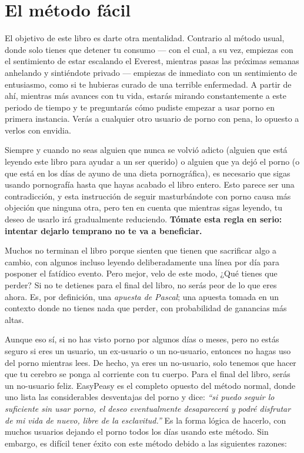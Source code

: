 \documentclass[
  spanish,
  openany]{book}
\begin{document}
\hypertarget{el-metodo-facil}{%
\chapter{El método fácil}\label{el-metodo-facil}}

El objetivo de este libro es darte otra mentalidad. Contrario al método usual, donde solo tienes que detener tu consumo --- con el cual, a su vez, empiezas con el sentimiento de estar escalando el Everest, mientras pasas las próximas semanas anhelando y sintiéndote privado --- empiezas de inmediato con un sentimiento de entusiasmo, como si te hubieras curado de una terrible enfermedad. A partir de ahí, mientras más avances con tu vida, estarás mirando constantemente a este periodo de tiempo y te preguntarás cómo pudiste empezar a usar porno en primera instancia. Verás a cualquier otro usuario de porno con pena, lo opuesto a verlos con envidia.

Siempre y cuando no seas alguien que nunca se volvió adicto (alguien que está leyendo este libro para ayudar a un ser querido) o alguien que ya dejó el porno (o que está en los días de ayuno de una dieta pornográfica), es necesario que sigas usando pornografía hasta que hayas acabado el libro entero. Esto parece ser una contradicción, y esta instrucción de seguir masturbándote con porno causa más objeción que ninguna otra, pero ten en cuenta que mientras sigas leyendo, tu deseo de usarlo irá gradualmente reduciendo. \textbf{Tómate esta regla en serio: intentar dejarlo temprano no te va a beneficiar.}

Muchos no terminan el libro porque sienten que tienen que sacrificar algo a cambio, con algunos incluso leyendo deliberadamente una línea por día para posponer el fatídico evento. Pero mejor, velo de este modo, ¿Qué tienes que perder? Si no te detienes para el final del libro, no serás peor de lo que eres ahora. Es, por definición, una \emph{apuesta de Pascal}; una apuesta tomada en un contexto donde no tienes nada que perder, con probabilidad de ganancias más altas.

Aunque eso sí, si no has visto porno por algunos días o meses, pero no estás seguro si eres un usuario, un ex-usuario o un no-usuario, entonces no hagas uso del porno mientras lees. De hecho, ya eres un no-usuario, solo tenemos que hacer que tu cerebro se ponga al corriente con tu cuerpo. Para el final del libro, serás un no-usuario feliz. EasyPeasy es el completo opuesto del método normal, donde uno lista las considerables desventajas del porno y dice:
\emph{``si puedo seguir lo suficiente sin usar porno, el deseo eventualmente desaparecerá y podré disfrutar de mi vida de nuevo, libre de la esclavitud.''}
Es la forma lógica de hacerlo, con muchos usuarios dejando el porno todos los días usando este método. Sin embargo, es difícil tener éxito con este método debido a las siguientes razones:
\end{document}
